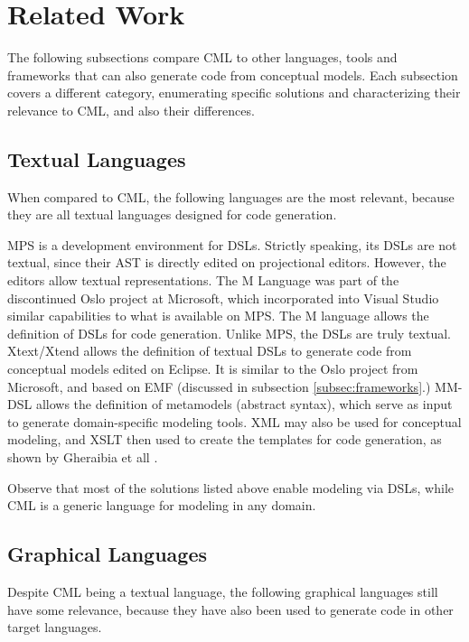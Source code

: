 \section{Related Work}\label{sec:related}

The following subsections compare CML to other languages, tools and frameworks
that can also generate code from conceptual models.
Each subsection covers a different category,
enumerating specific solutions and characterizing their relevance to CML, and also their differences. 

\subsection{Textual Languages}

When compared to CML, the following languages are the most relevant,
because they are all textual languages designed for code generation.

MPS \cite{voelter} is a development environment for DSLs.
Strictly speaking, its DSLs are not textual,
since their AST is directly edited on projectional editors.
However, the editors allow textual representations.
The M Language \cite{mlang} was part of the discontinued Oslo project at Microsoft,
which incorporated into Visual Studio similar capabilities to what is available on MPS.
The M language allows the definition of DSLs for code generation. Unlike MPS, the DSLs are truly textual.
Xtext/Xtend \cite{xtext} allows the definition of textual DSLs to generate code from conceptual models
edited on Eclipse. It is similar to the Oslo project from Microsoft,
and based on EMF \cite{emf} (discussed in subsection \ref{subsec:frameworks}.)
MM-DSL \cite{mm-dsl} allows the definition of metamodels (abstract syntax),
which serve as input to generate domain-specific modeling tools.
XML may also be used for conceptual modeling,
and XSLT then used to create the templates for code generation,
as shown by Gheraibia et all \cite{xslt}.

Observe that most of the solutions listed above enable modeling via DSLs,
while CML is a generic language for modeling in any domain.

\subsection{Graphical Languages}

Despite CML being a textual language,
the following graphical languages still have some relevance,
because they have also been used to generate code in other target languages.

